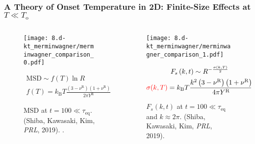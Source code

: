 \begin{frame}[c]
\frametitle{A Theory of Onset Temperature in 2D: Finite-Size Effects at $T \ll T_\mathrm{o}$
} %

\begin{columns}[T]

\begin{column}[T]{0.5\linewidth}

\begin{figure}
\texttt{[image: 8.d-kt\_merminwagner/merminwagner\_comparison\_0.pdf]}
\caption{MSD at $t=100 \ll \tau_\mathrm{eq}$. (Shiba, Kawasaki, Kim, \textit{PRL}, 2019).  .}
\vspace{-20pt}
\begin{gather*}
    \mathrm{MSD} \sim f(T) \ln R
    \\
    f(T) = k_{\mathrm{B}} T \frac{\left(3-\nu^{\mathrm{R}}\right)\left(1+\nu^{\mathrm{R}}\right)}{2 \pi Y^{\mathrm{R}}}
\end{gather*}
    
\end{figure}
\end{column}

\begin{column}[T]{0.5\linewidth}

\begin{figure}
\texttt{[image: 8.d-kt\_merminwagner/merminwagner\_comparison\_1.pdf]}
\caption{$F_s(k,t)$ at $t=100 \ll \tau_\mathrm{eq}$ and $k\approx 2\pi$. (Shiba, Kawasaki, Kim, \textit{PRL}, 2019). }
\vspace{-20pt}
    \begin{gather*}
    F_{s}\left(k,t \right)  \sim R^{-\frac{\sigma(k, T)}{2}} \\
    {\color{red}\sigma(k, T)} = k_{\mathrm{B}} T \frac{k^{2}\left(3-\nu^{\mathrm{R}}\right)\left(1+\nu^{\mathrm{R}}\right)}{4 \pi Y^{\mathrm{R}}}
    \end{gather*}
\end{figure}

\end{column}

\end{columns}

\end{frame}



